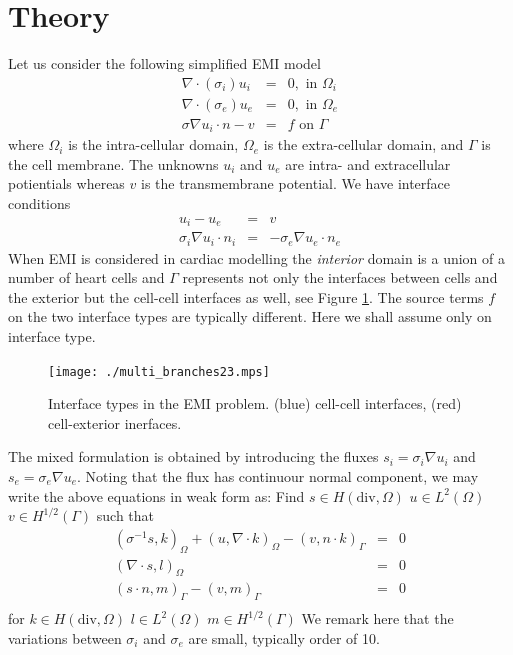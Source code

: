\documentclass[11pt,a4paper]{article}
\begin{document}
\section*{Theory}
Let us consider the following simplified EMI model 
\begin{eqnarray}
\nabla\cdot(\sigma_i) u_i &=& 0, \mbox{ in } \Omega_i \\
\nabla\cdot(\sigma_e) u_e &=& 0, \mbox{ in } \Omega_e \\
\sigma \nabla u_i \cdot n  -v &=& f \mbox{ on } \Gamma    
\end{eqnarray}
where 
$\Omega_i$ is the intra-cellular domain,  $\Omega_e$ 
is the extra-cellular domain,  and $\Gamma$ is 
the cell membrane. The unknowns $u_i$ and $u_e$ are
intra- and extracellular potientials whereas
$v$ is the transmembrane potential.  
We have interface conditions
\begin{eqnarray}
u_i - u_e &=& v  \\
\sigma_i \nabla u_i \cdot n_i &=& -\sigma_e \nabla u_e \cdot n_e 
\end{eqnarray}
When EMI is considered in cardiac modelling the \emph{interior} domain is
a union of a number of heart cells and $\Gamma$ represents not only the
interfaces between cells and the exterior but the cell-cell interfaces as well,
see Figure \ref{fig:iface_types}. The source terms $f$ on the two interface types
are typically different. Here we shall assume only on interface type.

\begin{figure}
      \begin{center}
     \texttt{[image: ./multi\_branches23.mps]}
   \end{center}
   \caption{Interface types in the EMI problem. (blue) cell-cell interfaces,
     (red) cell-exterior inerfaces.}
   \label{fig:iface_types}
\end{figure}

The mixed formulation is obtained
by introducing the fluxes $s_i = \sigma_i \nabla u_i$ 
and $s_e = \sigma_e \nabla u_e$. Noting that the flux has continuour normal
component, we may write the above equations 
in weak form as: Find 
$s \in H(\mbox{div}, \Omega)$   
$u \in L^2(\Omega)$   
$v \in H^{1/2}(\Gamma)$  such that 
\begin{eqnarray}
(\sigma^{-1} s, k)_{\Omega} + (u, \nabla \cdot k)_{\Omega} - (v,   n \cdot k)_\Gamma &=& 0 \\    
(\nabla \cdot s, l)_{\Omega} &=& 0 \\ 
(s\cdot n, m)_{\Gamma} - (v, m)_{\Gamma} &=& 0 \\ 
\end{eqnarray}
for
$k \in H(\mbox{div}, \Omega)$   
$l \in L^2(\Omega)$   
$m \in H^{1/2}(\Gamma)$ 
We remark here that the variations
between $\sigma_i$ and $\sigma_e$ are
small, typically order of 10. 
\end{document}
